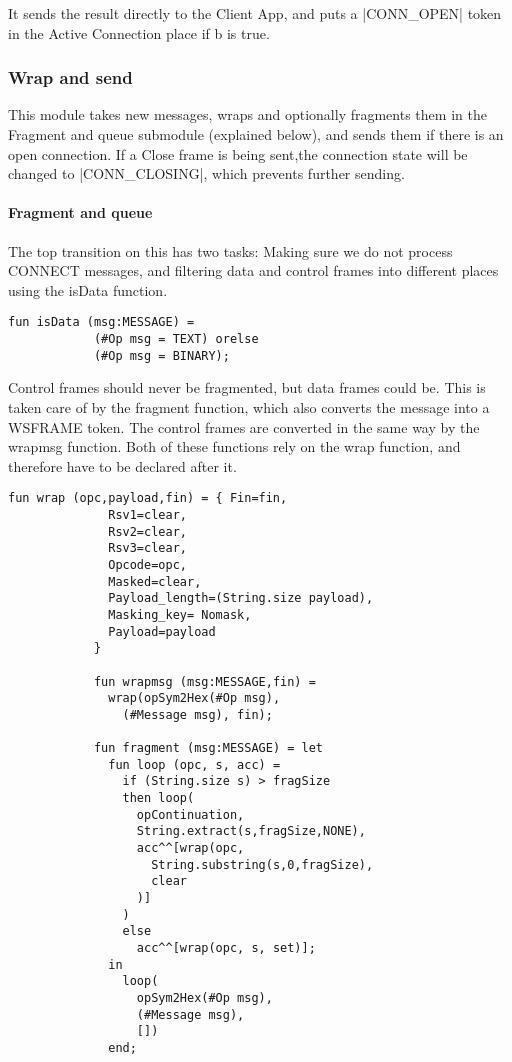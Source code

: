 		It sends the result directly to the Client App, and puts a |CONN_OPEN| token
		in the Active Connection place if b is true.
		
	\subsubsection{Wrap and send}
		
		
		This module takes new messages, wraps and optionally fragments them in the
		Fragment and queue submodule (explained below), and sends them if there is
		an open connection. If a Close frame is being sent,the
		connection state will be changed to |CONN_CLOSING|, which prevents
		further sending.
		
		\paragraph{Fragment and queue}
			
			
			The top transition on this has two tasks: Making sure we do not process
			CONNECT messages, and filtering data and control frames into different
			places using the isData function. 
			
			\begin{lstlisting}[label=lst:isData,caption=isData,gobble=3]
			fun isData (msg:MESSAGE) =
			(#Op msg = TEXT) orelse
			(#Op msg = BINARY);
			\end{lstlisting}
			
			Control frames should never be fragmented, but data frames could be. This is
			taken care of by the fragment function, which also converts the message into
			a WSFRAME token. The control frames are converted in the same way by the
			wrapmsg function. Both of these functions rely on the wrap function, and
			therefore have to be declared after it.
			
			
			\begin{lstlisting}[label=lst:fragment,caption=wrap wrapmsg and
			fragment,gobble=3]
			fun wrap (opc,payload,fin) = { Fin=fin,
			  Rsv1=clear,
			  Rsv2=clear,
			  Rsv3=clear,
			  Opcode=opc,
			  Masked=clear,
			  Payload_length=(String.size payload),
			  Masking_key= Nomask,
			  Payload=payload
			}
			
			fun wrapmsg (msg:MESSAGE,fin) = 
			  wrap(opSym2Hex(#Op msg), 
			    (#Message msg), fin);
			    
			fun fragment (msg:MESSAGE) = let
			  fun loop (opc, s, acc) = 
			    if (String.size s) > fragSize
			    then loop(
			      opContinuation,
			      String.extract(s,fragSize,NONE),
			      acc^^[wrap(opc, 
			        String.substring(s,0,fragSize), 
			        clear
			      )]
			    )
			    else 
			      acc^^[wrap(opc, s, set)];
			  in 
			    loop(
			      opSym2Hex(#Op msg), 
			      (#Message msg), 
			      [])
			  end;
			\end{lstlisting}
			
